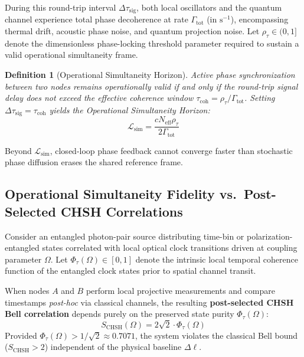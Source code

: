 \documentclass[11pt,a4paper]{article}
\newtheorem{definition}{Definition}
\begin{document}
During this round-trip interval $\Delta\tau_{\mathrm{sig}}$, both local oscillators and the quantum channel experience total phase decoherence at rate $\Gamma_{\mathrm{tot}}$ (in $\mathrm{s}^{-1}$), encompassing thermal drift, acoustic phase noise, and quantum projection noise. Let $\rho_\tau \in (0, 1]$ denote the dimensionless phase-locking threshold parameter required to sustain a valid operational simultaneity frame.

\begin{definition}[Operational Simultaneity Horizon]
Active phase synchronization between two nodes remains operationally valid if and only if the round-trip signal delay does not exceed the effective coherence window $\tau_{\mathrm{coh}} = \rho_\tau / \Gamma_{\mathrm{tot}}$. Setting $\Delta\tau_{\mathrm{sig}} = \tau_{\mathrm{coh}}$ yields the Operational Simultaneity Horizon:
\begin{equation}
    \mathcal{L}_{\mathrm{sim}} = \frac{c N_{\mathrm{eff}} \rho_\tau}{2 \Gamma_{\mathrm{tot}}}
    \label{eq:lsim}
\end{equation}
\end{definition}

Beyond $\mathcal{L}_{\mathrm{sim}}$, closed-loop phase feedback cannot converge faster than stochastic phase diffusion erases the shared reference frame.

\subsection{Operational Simultaneity Fidelity vs.\ Post-Selected CHSH Correlations}

Consider an entangled photon-pair source distributing time-bin or polarization-entangled states correlated with local optical clock transitions driven at coupling parameter $\Omega$. Let $\Phi_\tau(\Omega) \in [0, 1]$ denote the intrinsic local temporal coherence function of the entangled clock states prior to spatial channel transit.

When nodes $A$ and $B$ perform local projective measurements and compare timestamps \emph{post-hoc} via classical channels, the resulting \textbf{post-selected CHSH Bell correlation} depends purely on the preserved state purity $\Phi_\tau(\Omega)$:
\begin{equation}
    S_{\mathrm{CHSH}}(\Omega) = 2\sqrt{2} \cdot \Phi_\tau(\Omega)
    \label{eq:chsh}
\end{equation}
Provided $\Phi_\tau(\Omega) > 1/\sqrt{2} \approx 0.7071$, the system violates the classical Bell bound ($S_{\mathrm{CHSH}} > 2$) independent of the physical baseline $\Delta\ell$.
\end{document}
